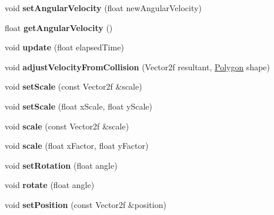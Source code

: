 \begin{DoxyCompactItemize}
\item 
\mbox{\label{class_polygon_a9444a506f5e33f11772854396e1aae0e}} 
void {\bfseries set\+Angular\+Velocity} (float new\+Angular\+Velocity)
\item 
\mbox{\label{class_polygon_a1c28d47f1c0f779cfd5ef31815046a6f}} 
float {\bfseries get\+Angular\+Velocity} ()
\item 
\mbox{\label{class_polygon_a556290c37a29ce71f8488a75509b56af}} 
void {\bfseries update} (float elapsed\+Time)
\item 
\mbox{\label{class_polygon_aeb1576854a28a02afaa636aadf31b992}} 
void {\bfseries adjust\+Velocity\+From\+Collision} (Vector2f resultant, \mbox{\hyperlink{class_polygon}{Polygon}} shape)
\item 
\mbox{\label{class_polygon_aacc719afa9e8befd7ab7ba5ea3eb4d24}} 
void {\bfseries set\+Scale} (const Vector2f \&scale)
\item 
\mbox{\label{class_polygon_a1454b2d9f4ca39f627ea6c54a26a3287}} 
void {\bfseries set\+Scale} (float x\+Scale, float y\+Scale)
\item 
\mbox{\label{class_polygon_ab908fe54a3dfad70b489578b4d0f0e42}} 
void {\bfseries scale} (const Vector2f \&scale)
\item 
\mbox{\label{class_polygon_ac2b18a3139994184f83967add25f72aa}} 
void {\bfseries scale} (float x\+Factor, float y\+Factor)
\item 
\mbox{\label{class_polygon_a6eaf72c376c1fc1d6a9fba7b34b2d93d}} 
void {\bfseries set\+Rotation} (float angle)
\item 
\mbox{\label{class_polygon_aa31dcb66b6c3bffd9643590abf805c26}} 
void {\bfseries rotate} (float angle)
\item 
\mbox{\label{class_polygon_a79db7b74993e7c419e1e3243a6b2e4e2}} 
void {\bfseries set\+Position} (const Vector2f \&position)
\item 
\mbox{\label{class_polygon_a59fc0fa86f807dc3921bae20739fdbb1}} 

\end{DoxyCompactItemize}
